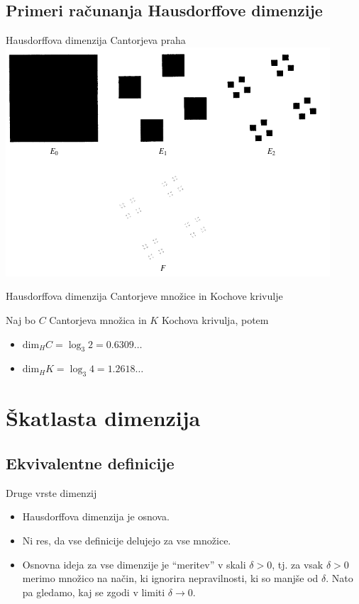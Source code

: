 \documentclass[10pt]{beamer}
\begin{document}
\subsection{Primeri računanja Hausdorffove dimenzije}
\begin{frame}[t]{Hausdorffova dimenzija Cantorjeva praha}
    \centering
    \includegraphics[width=\textwidth]{img/cantor_dust.png} 
\end{frame}

\begin{frame}[t]{Hausdorffova dimenzija Cantorjeve množice in Kochove krivulje}
    \begin{primer}
        Naj bo \(C\) Cantorjeva množica in \(K\) Kochova krivulja, potem
        \begin{itemize}
            \item \(\text{dim}_H C = \log_3 2 = 0.6309\ldots\)
            \item \(\text{dim}_H K = \log_3 4 = 1.2618\ldots\)
        \end{itemize}
    \end{primer}    
\end{frame}

\section{Škatlasta dimenzija}
\subsection{Ekvivalentne definicije}
\begin{frame}[t]{Druge vrste dimenzij}
    \begin{opomba}
        \begin{itemize}
            \item Hausdorffova dimenzija je osnova.
            \item Ni res, da vse definicije delujejo za vse množice.
            \item Osnovna ideja za vse dimenzije je "`meritev"' v skali \(\delta > 0\), tj. za vsak \(\delta > 0\) merimo množico na način, ki ignorira nepravilnosti, ki so manjše od \(\delta\). Nato pa gledamo, kaj se zgodi v limiti \(\delta \to 0\).
        \end{itemize}
    \end{opomba}
\end{frame}
\end{document}
